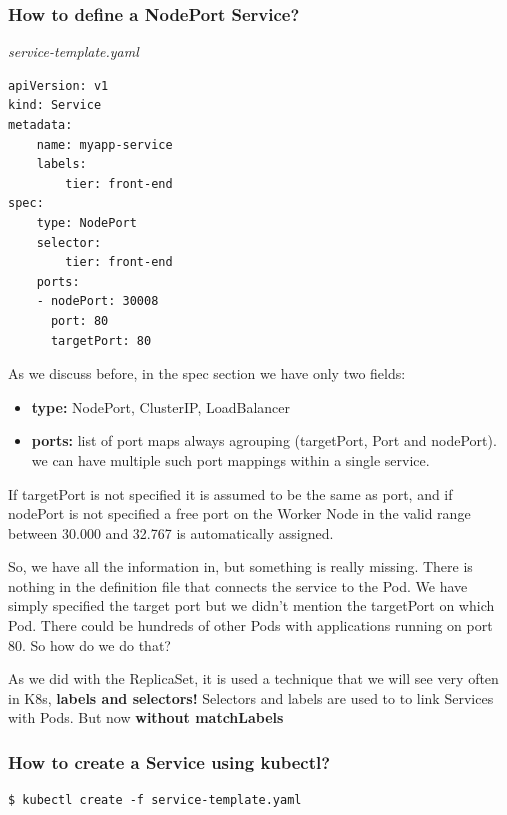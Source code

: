 \documentclass{article}
\newenvironment{blocktemplateII}[1]{%
    \tcolorbox[beamer,%
    noparskip,breakable,
    colframe=Green,%
    colbacklower=LimeGreen!75!LightGreen,%
    title=#1]}%
    {\endtcolorbox}
\newenvironment{codetemplate}[1][]{%
  \mybasecolorbox[#1]
  \itshape
}{%
  \endmybasecolorbox
}
\begin{document}
\subsubsection{How to define a NodePort Service?}

\begin{codetemplate}{service-template.yaml}
\begin{verbatim}
apiVersion: v1
kind: Service
metadata:
    name: myapp-service
    labels:
        tier: front-end
spec:
    type: NodePort
    selector:
        tier: front-end
    ports:
    - nodePort: 30008
      port: 80
      targetPort: 80
\end{verbatim}
\end{codetemplate}

As we discuss before, in the spec section we have only two fields:

\begin{itemize}
    \item\textbf{type:} NodePort, ClusterIP, LoadBalancer
    \item \textbf{ports:} list of port maps always agrouping (targetPort, Port and nodePort). we can have multiple such port mappings within a single service.
\end{itemize}

\begin{blocktemplateII}{NOTE}
If targetPort is not specified it is assumed to be the same as port, and if nodePort is not specified a free port on the Worker Node in the valid range between 30.000 and 32.767 is automatically assigned.
\end{blocktemplateII}

So, we have all the information in, but something is really missing. There is nothing in the definition file that connects the service to the Pod. We have simply specified the target port but we didn't mention the targetPort on which Pod. There could be hundreds of other Pods with applications running on port 80. So how do we do that?

As we did with the ReplicaSet, it is used a technique that we will see very often in K8s, \textbf{labels and selectors!} Selectors and labels are used to to link Services with Pods. But now \textbf{without matchLabels}

\subsubsection{How to create a Service using kubectl?}
\begin{codetemplate}{}
\begin{verbatim}
$ kubectl create -f service-template.yaml
\end{verbatim}
\end{codetemplate}
\end{document}
